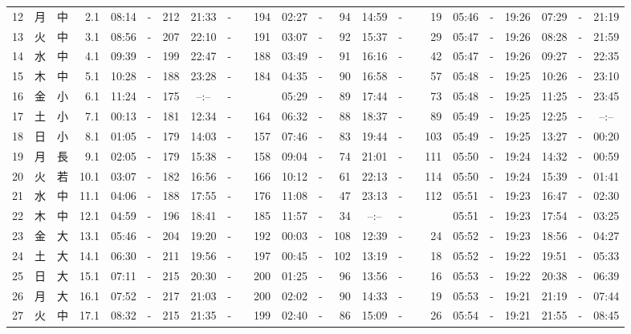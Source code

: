\documentclass[12pt,a4j]{jsarticle}
\begin{document}
\begin{table}[htbp]
\begin{center}
{\begin{tabular}{|rc|cr|ccrccr|ccrccr|ccc|ccc|}
12 & 月 & 中 &  2.1 &  08:14 &-& 212 &  21:33 &-& 194 &  02:27 &-&  94 &  14:59 &-&  19 & 05:46 & -& 19:26 & 07:29 & -& 21:19 \\
13 & 火 & 中 &  3.1 &  08:56 &-& 207 &  22:10 &-& 191 &  03:07 &-&  92 &  15:37 &-&  29 & 05:47 & -& 19:26 & 08:28 & -& 21:59 \\
14 & 水 & 中 &  4.1 &  09:39 &-& 199 &  22:47 &-& 188 &  03:49 &-&  91 &  16:16 &-&  42 & 05:47 & -& 19:26 & 09:27 & -& 22:35 \\
15 & 木 & 中 &  5.1 &  10:28 &-& 188 &  23:28 &-& 184 &  04:35 &-&  90 &  16:58 &-&  57 & 05:48 & -& 19:25 & 10:26 & -& 23:10 \\
16 & 金 & 小 &  6.1 &  11:24 &-& 175 &  --:-- &-&~~~~~ &  05:29 &-&  89 &  17:44 &-&  73 & 05:48 & -& 19:25 & 11:25 & -& 23:45 \\
17 & 土 & 小 &  7.1 &  00:13 &-& 181 &  12:34 &-& 164 &  06:32 &-&  88 &  18:37 &-&  89 & 05:49 & -& 19:25 & 12:25 & -& --:-- \\
18 & 日 & 小 &  8.1 &  01:05 &-& 179 &  14:03 &-& 157 &  07:46 &-&  83 &  19:44 &-& 103 & 05:49 & -& 19:25 & 13:27 & -& 00:20 \\
19 & 月 & 長 &  9.1 &  02:05 &-& 179 &  15:38 &-& 158 &  09:04 &-&  74 &  21:01 &-& 111 & 05:50 & -& 19:24 & 14:32 & -& 00:59 \\
20 & 火 & 若 & 10.1 &  03:07 &-& 182 &  16:56 &-& 166 &  10:12 &-&  61 &  22:13 &-& 114 & 05:50 & -& 19:24 & 15:39 & -& 01:41 \\
21 & 水 & 中 & 11.1 &  04:06 &-& 188 &  17:55 &-& 176 &  11:08 &-&  47 &  23:13 &-& 112 & 05:51 & -& 19:23 & 16:47 & -& 02:30 \\
22 & 木 & 中 & 12.1 &  04:59 &-& 196 &  18:41 &-& 185 &  11:57 &-&  34 &  --:-- &-&~~~~~ & 05:51 & -& 19:23 & 17:54 & -& 03:25 \\
23 & 金 & 大 & 13.1 &  05:46 &-& 204 &  19:20 &-& 192 &  00:03 &-& 108 &  12:39 &-&  24 & 05:52 & -& 19:23 & 18:56 & -& 04:27 \\
24 & 土 & 大 & 14.1 &  06:30 &-& 211 &  19:56 &-& 197 &  00:45 &-& 102 &  13:19 &-&  18 & 05:52 & -& 19:22 & 19:51 & -& 05:33 \\
25 & 日 & 大 & 15.1 &  07:11 &-& 215 &  20:30 &-& 200 &  01:25 &-&  96 &  13:56 &-&  16 & 05:53 & -& 19:22 & 20:38 & -& 06:39 \\
26 & 月 & 大 & 16.1 &  07:52 &-& 217 &  21:03 &-& 200 &  02:02 &-&  90 &  14:33 &-&  19 & 05:53 & -& 19:21 & 21:19 & -& 07:44 \\
27 & 火 & 中 & 17.1 &  08:32 &-& 215 &  21:35 &-& 199 &  02:40 &-&  86 &  15:09 &-&  26 & 05:54 & -& 19:21 & 21:55 & -& 08:45 \\

\end{tabular}}
\end{center}
\end{table}
\end{document}
